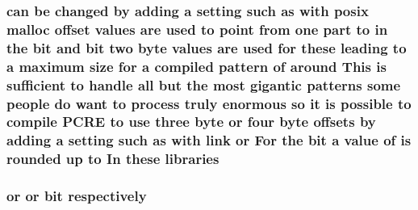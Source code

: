 \subsubsection[{\texorpdfstring{libraries}{libraries}}]{ {\bf can} {\bf be} changed by {\bf adding} {\bf a} {\bf setting} such {\bf as} {\bf with} posix {\bf malloc} {\bf offset} {\bf values} {\bf are} {\bf used} {\bf to} {\bf point} {\bf from} one part {\bf to} {\bf in} the {\bf bit} and {\bf bit} two byte {\bf values} {\bf are} {\bf used} for these leading {\bf to} {\bf a} maximum {\bf size} for {\bf a} {\bf compiled} {\bf pattern} {\bf of} around This {\bf is} sufficient {\bf to} {\bf handle} {\bf all} but the most gigantic {\bf patterns} some people {\bf do} want {\bf to} {\bf process} truly enormous {\bf so} {\bf it} {\bf is} {\bf possible} {\bf to} {\bf compile} {\bf P\+C\+RE} {\bf to} use three byte {\bf or} four byte {\bf offsets} by {\bf adding} {\bf a} {\bf setting} such {\bf as} {\bf with} link {\bf or} For the {\bf bit} {\bf a} {\bf value} {\bf of} {\bf is} rounded up {\bf to} In these libraries}\hypertarget{pcre-config_8txt_a0534839528d024a80d06be3b3047e856}{}\label{pcre-config_8txt_a0534839528d024a80d06be3b3047e856}
\subsubsection[{\texorpdfstring{respectively}{respectively}}]{ {\bf or} {\bf or} {\bf bit} respectively}\hypertarget{pcre-config_8txt_a31b9ef249a90b01994c2c4d8b61ccace}{}\label{pcre-config_8txt_a31b9ef249a90b01994c2c4d8b61ccace}
